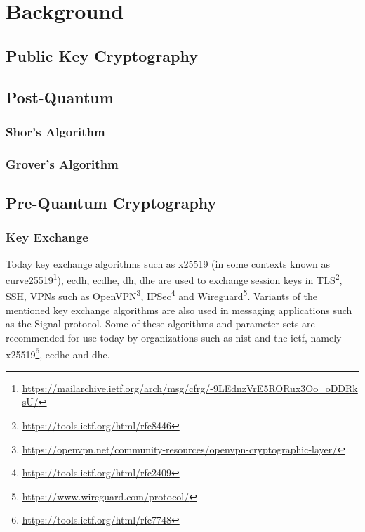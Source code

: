 \chapter{Background}
\label{chapter:background}

\section{Public Key Cryptography}


\section{Post-Quantum}


\subsection{Shor's Algorithm}

\subsection{Grover's Algorithm}

\section{Pre-Quantum Cryptography}

\subsection{Key Exchange}

Today key exchange algorithms such as \gls{x25519} (in some contexts known as \gls{curve25519}\footnote{\href{https://mailarchive.ietf.org/arch/msg/cfrg/-9LEdnzVrE5RORux3Oo\_oDDRksU/}{https://mailarchive.ietf.org/arch/msg/cfrg/-9LEdnzVrE5RORux3Oo\_oDDRksU/}}), \gls{ecdh}, \gls{ecdhe}, \gls{dh}, \gls{dhe} are used to exchange session keys in TLS\footnote{\href{https://tools.ietf.org/html/rfc8446}{https://tools.ietf.org/html/rfc8446}}, SSH\cite{williams2011}, VPNs such as OpenVPN\footnote{\href{https://openvpn.net/community-resources/openvpn-cryptographic-layer/}{https://openvpn.net/community-resources/openvpn-cryptographic-layer/}}, IPSec\footnote{\href{https://tools.ietf.org/html/rfc2409}{https://tools.ietf.org/html/rfc2409}} and Wireguard\footnote{\href{https://www.wireguard.com/protocol/}{https://www.wireguard.com/protocol/}}. Variants of the mentioned key exchange algorithms are also used in messaging applications such as the Signal protocol\cite{gordon2017}. Some of these algorithms and parameter sets are recommended for use today by organizations such as \gls{nist} and the \gls{ietf}, namely \gls{x25519}\footnote{\href{https://tools.ietf.org/html/rfc7748}{https://tools.ietf.org/html/rfc7748}}, \gls{ecdhe}\cite{nist2019} and \gls{dhe}\cite{nist2019}.

